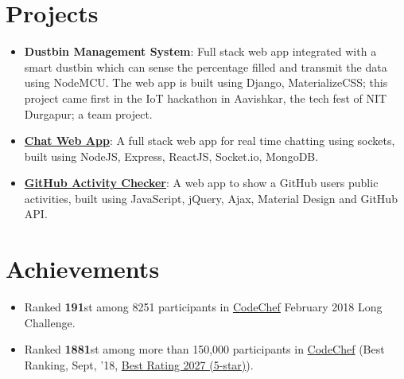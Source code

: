 \documentclass[a4paper,11pt]{article}
\newcommand{\resumeItemListStart}{\begin{itemize}}
\newcommand{\resumeItemListEnd}{\end{itemize}\vspace{-5pt}}
\begin{document}
\section{Projects}
      \setlength{\itemsep}{0.5pt}
      \begin{itemize}
        \item\textbf{Dustbin Management System}{: Full stack web app integrated with a smart dustbin which can sense the percentage filled and transmit the data using NodeMCU. The web app is built using Django, MaterializeCSS; this project came first in the IoT hackathon in Aavishkar, the tech
        fest of NIT Durgapur; a team project.}
        \item\textbf{\href{https://github.com/ayan-b/chat-web-app}{Chat Web App}}{: A full stack web app for real time chatting using sockets, built using NodeJS, Express, ReactJS, Socket.io, MongoDB.}
        \item\textbf{\href{https://github.com/ayan-b/GitHub-Activity-Checker}{GitHub Activity Checker}}{: A web app to show a GitHub user\textsc{}s public activities, built using JavaScript, jQuery, Ajax, Material Design and GitHub API.}
      \end{itemize}
  
\section{Achievements}
    \resumeItemListStart
     \setlength{\itemsep}{0.5pt}
      \item
        {Ranked \textbf{191}st among 8251 participants in \href{https://www.codechef.com/rankings/FEB18?filterBy=Institution\%3DNational\%20Institute\%20of\%20Technology\%2C\%20Durgapur&order=asc&sortBy=rank}{CodeChef} February 2018 Long Challenge.}
      \item
        {Ranked \textbf{1881}st among more than 150,000 participants in \href{https://codechef.com/users/ayan_nitd}{CodeChef} (Best Ranking, Sept, '18, \href{https://www.codechef.com/users/ayan_nitd}{Best Rating 2027 (5-star)}).}
    \resumeItemListEnd
\end{document}
